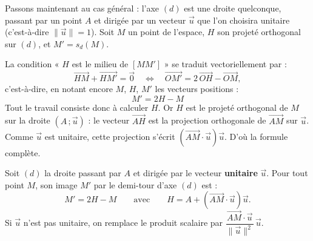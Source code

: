 \documentclass[11pt]{article}
\newcommand{\cle}[1]{{\popxbold\color{popdark}#1}}
\begin{document}
Passons maintenant au cas général : l'axe $(d)$ est une droite quelconque, passant par un point $A$ et dirigée par un vecteur $\vec{u}$ que l'on choisira \cle{unitaire} (c'est-à-dire $\|\vec{u}\| = 1$). Soit $M$ un point de l'espace, $H$ son projeté orthogonal sur $(d)$, et $M' = s_d(M)$.

La condition « $H$ est le milieu de $[MM']$ » se traduit vectoriellement par :
\[
\overrightarrow{HM} + \overrightarrow{HM'} = \vec{0}
\quad\Longleftrightarrow\quad
\overrightarrow{OM'} = 2\,\overrightarrow{OH} - \overrightarrow{OM},
\]
c'est-à-dire, en notant encore $M$, $H$, $M'$ les vecteurs positions :
\[
\boxed{\;M' = 2H - M\;}
\]
Tout le travail consiste donc à calculer $H$. Or $H$ est le projeté orthogonal de $M$ sur la droite $(A\,;\vec{u})$ : le vecteur $\overrightarrow{AH}$ est la projection orthogonale de $\overrightarrow{AM}$ sur $\vec{u}$. Comme $\vec{u}$ est unitaire, cette projection s'écrit $\left(\overrightarrow{AM}\cdot\vec{u}\right)\vec{u}$. D'où la formule complète.

\begin{propriete}
Soit $(d)$ la droite passant par $A$ et dirigée par le vecteur \textbf{unitaire} $\vec{u}$. Pour tout point $M$, son image $M'$ par le demi-tour d'axe $(d)$ est :
\[
M' = 2H - M
\qquad\text{avec}\qquad
H = A + \left(\overrightarrow{AM}\cdot\vec{u}\right)\vec{u}.
\]
Si $\vec{u}$ n'est pas unitaire, on remplace le produit scalaire par $\dfrac{\overrightarrow{AM}\cdot\vec{u}}{\|\vec{u}\|^{2}}\,\vec{u}$.
\end{propriete}
\end{document}
